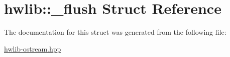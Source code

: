 \hypertarget{structhwlib_1_1__flush}{}\section{hwlib\+:\+:\+\_\+flush Struct Reference}
\label{structhwlib_1_1__flush}


The documentation for this struct was generated from the following file\+:\begin{DoxyCompactItemize}
\item 
\hyperlink{hwlib-ostream_8hpp}{hwlib-\/ostream.\+hpp}\end{DoxyCompactItemize}

